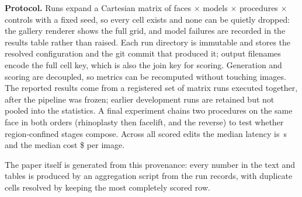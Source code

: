\textbf{Protocol.} Runs expand a Cartesian matrix of faces $\times$ models
$\times$ procedures $\times$ controls with a fixed seed, so every cell exists and
none can be quietly dropped: the gallery renderer shows the full grid, and model
failures are recorded in the results table rather than raised. Each run directory
is immutable and stores the resolved configuration and the git commit that produced
it; output filenames encode the full cell key, which is also the join key for
scoring. Generation and scoring are decoupled, so metrics can be recomputed without
touching images. The reported results come from a registered set of matrix runs
executed together, after the pipeline was frozen; earlier development runs are
retained but not pooled into the statistics. A final experiment chains two
procedures on the same face in both orders (rhinoplasty then facelift, and the
reverse) to test whether region-confined stages compose. Across all scored edits
the median latency is \MedLatency{}\,s and the median cost \$\MedCost{} per
image.

The paper itself is generated from this provenance: every number in the text and
tables is produced by an aggregation script from the run records, with duplicate
cells resolved by keeping the most completely scored row.

